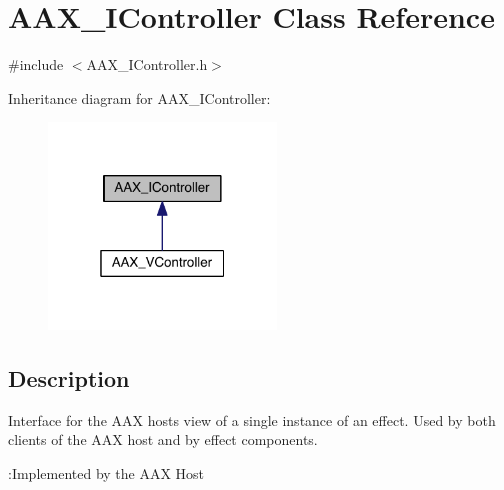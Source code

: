 \hypertarget{a00090}{}\section{A\+A\+X\+\_\+\+I\+Controller Class Reference}
\label{a00090}


{\ttfamily \#include $<$A\+A\+X\+\_\+\+I\+Controller.\+h$>$}



Inheritance diagram for A\+A\+X\+\_\+\+I\+Controller\+:
\nopagebreak
\begin{figure}[H]
\begin{center}
\leavevmode
\includegraphics[width=172pt]{a00609}
\end{center}
\end{figure}


\subsection{Description}
Interface for the A\+A\+X host\textquotesingle{}s view of a single instance of an effect. Used by both clients of the A\+A\+X host and by effect components. 

\begin{DoxyRefDesc}{\+:\+Implemented by the A\+A\+X Host}
\item[\hyperlink{a00001__aax_host_implementation000004}{\+:\+Implemented by the A\+A\+X Host}]\end{DoxyRefDesc}
